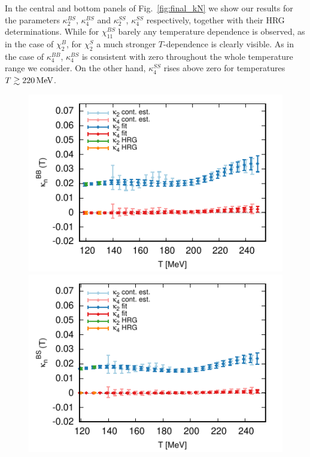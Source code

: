 \documentclass[aps,prd,twocolumn,superscriptaddress]{revtex4-2}
\newcommand{\MeV}{\, {\rm MeV}}
\begin{document}
In the central and bottom panels of Fig.~\ref{fig:final_kN} we show our 
results for the parameters $\kappa_2^{BS}$, $\kappa_4^{BS}$ and
$\kappa_2^{SS}$, $\kappa_4^{SS}$ respectively, together with their HRG
determinations. While for $\chi_{11}^{BS}$ barely any temperature dependence is
observed, as in the case of $\chi_2^B$, for $\chi_2^S$ a much stronger
$T$-dependence is clearly visible. As in the case of $\kappa_4^{BB}$,
$\kappa_4^{BS}$ is consistent with zero throughout the whole temperature range
we consider. On the other hand, $\kappa_4^{SS}$ rises above zero for
temperatures $T \gtrsim 220 \MeV$.

\begin{figure}[!]
\includegraphics[width=\linewidth]{figures/fit_kappaNB2_paper.pdf}
\includegraphics[width=\linewidth]{figures/fit_kappaNBS_paper.pdf}

\end{figure}
\end{document}
